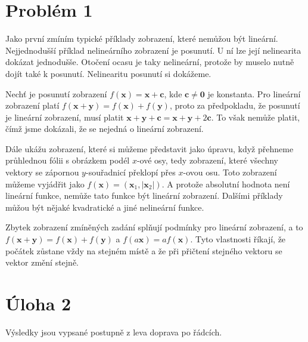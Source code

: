 \documentclass{fkssolpub}
\author{Ondřej Sedláček}
\begin{document}
\section{Problém 1}

Jako první zmíním typické příklady zobrazení, které nemůžou být lineární. Nejjednodušší příklad nelineárního zobrazení je posunutí. U ní lze její nelinearita dokázat jednodušše. Otočení ocasu je taky nelineární, protože by muselo nutně dojít také k posunutí. Nelinearitu posunutí si dokážeme.

Nechť je posunutí zobrazení $f(\mathbf{x}) = \mathbf{x} + \mathbf{c}$, kde $\mathbf{c} \neq \mathbf{0}$ je konstanta. Pro lineární zobrazení platí $f(\mathbf{x} + \mathbf{y}) = f(\mathbf{x}) + f(\mathbf{y})$, proto za předpokladu, že posunutí je lineární zobrazení, musí platit $\mathbf{x} + \mathbf{y} + \mathbf{c} = \mathbf{x} + \mathbf{y} + 2 \mathbf{c}$. To však nemůže platit, čímž jsme dokázali, že se nejedná o lineární zobrazení.

Dále ukážu zobrazení, které si můžeme představit jako úpravu, když přehneme průhlednou fólii s obrázkem podél $x$-ové osy, tedy zobrazení, které všechny vektory se zápornou $y$-souřadnicí překlopí přes $x$-ovou osu. Toto zobrazení můžeme vyjádřit jako $f(\mathbf{x}) = (\mathbf{x}_1, |\mathbf{x}_2|)$. A protože absolutní hodnota není lineární funkce, nemůže tato funkce být lineární zobrazení. Dalšími příklady můžou být nějaké kvadratické a jiné nelineární funkce.

Zbytek zobrazení zmíněných zadání splňují podmínky pro lineární zobrazení, a to $f(\mathbf{x} + \mathbf{y}) = f(\mathbf{x}) + f(\mathbf{y})$ a $f(a \mathbf{x}) = a f(\mathbf{x})$. Tyto vlastnosti říkají, že počátek zůstane vždy na stejném místě a že při přičtení stejného vektoru se vektor změní stejně.

\section{Úloha 2}

Výsledky jsou vypsané postupně z leva doprava po řádcích.
\end{document}

